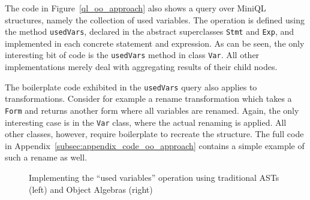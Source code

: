 The code in Figure~\ref{ql_oo_approach} also shows a query over MiniQL structures, namely the collection of used variables.
The operation is defined using the method \lstinline{usedVars}, declared in the abstract superclasses  \lstinline{Stmt} and \lstinline{Exp}, and implemented in each concrete statement and expression.
As can be seen, the only interesting bit of code is the \lstinline{usedVars} method in class \lstinline{Var}.
All other implementations merely deal with aggregating results of their child nodes.

The boilerplate code exhibited in the \lstinline{usedVars} query also applies to transformations.
Consider for example a rename transformation which takes a \lstinline{Form} and returns another form where all variables are renamed.
Again, the only interesting case is in the \lstinline{Var} class, where the actual renaming is applied. All other classes, however, require boilerplate to recreate the structure.
The full code in Appendix~\ref{subsec:appendix_code_oo_approach} contains a simple example of such a rename as well.


\begin{figure*}[t]
  \nocaptionrule
  \begin{minipage}[t]{0.48\textwidth}
  \end{minipage}
  \vline
  \hspace*{2pt}
  \begin{minipage}[t]{0.48\textwidth}
  \end{minipage}
  
    \caption{Implementing the ``used variables'' operation using traditional ASTs (left) and Object Algebras (right)}\label{LST:usedVars}
\end{figure*}



